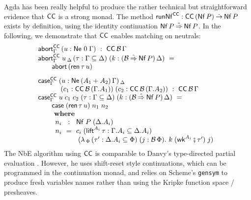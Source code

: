 \documentclass[sigplan,screen,fleqn,review]{acmart} %
\begin{document}
Agda has been really helpful to produce the rather technical but
straightforward evidence that $\CC$ is a strong monad.
The method $\trunNf[\CC] : \CC\,(\tNf\,P) \todot \tNf\,P$
exists by definition, using the identity continuation $\tNf\,P \hatto \tNf\,P$.
In the following, we demonstrate that $\CC$
enables matching on neutrals:
\[
\renewcommand{\left}{}
\renewcommand{\right}{}
\begin{array}{l}
  \tabort^{\CC}_\Gamma \, (u : \Ne \tyzero \Gamma) ~:~  \CC\,\B\,\Gamma \\[0.2ex]
  \tabort^{\CC}_\Gamma
    \; u
    \, _\Delta
    \, (\tau : \Gamma \sublist \Delta)
    \; (k : (\B \hatto \tNf\,P)\,\Delta)
     ~=~ \\  \qquad
    \tabort\,(\tren\,\tau\,u)
\\[2ex]
  \tcase^{\CC}_\Gamma
     \; (u : \NeP {A_1 + A_2} \Gamma) \, _\Delta \\ \qquad \quad
     \; (c_1 : \CC\,\B\,(\cext \Gamma {A_1}))
     \; (c_2 : \CC\,\B\,(\cext \Gamma {A_2}))
    ~:~ \CC\,\B\,\Gamma \\
  \tcase^{\CC}_\Gamma
    \; u
    \; c_1
    \; c_2
    \; (\tau : \Gamma \sublist \Delta)
    \; (k : (\B \hatto \tNf\,P)\,\Delta)
     ~=~ \\  \qquad
    \tcase\;(\tren\,\tau\,u)\;n_1\;n_2
    \\ \qquad \bwhere \\
\qquad
  \begin{array}{l@{~~}c@{~~}l}
     n_i & : & \Nf P {(\cext \Delta {A_i})} \\
     n_i & = & c_i
      \; (\tlift^{A_i}\,\tau
            : \cext \Gamma {A_i} \sublist \cext \Delta {A_i})
\\ &&
      \; \left(\lambda
            \, _\Phi
            \, (\tau' : \cext \Delta {A_i} \sublist \Phi)
            \; (j :  \B\,\Phi) .
            \ k
            \; (\twk^{A_i} \rcomp \tau')
            \; j
         \right)
  \end{array}
\end{array}
\]
The NbE algorithm using $\CC$ is comparable to Danvy's type-directed
partial evaluation \cite[Figure~8]{danvy:popl96}.  However, he uses
shift-reset style continuations, which can be programmed in the
continuation monad, and relies on Scheme's \texttt{gensym} to produce
fresh variables names rather than using the Kripke function space / presheaves.


\end{document}
